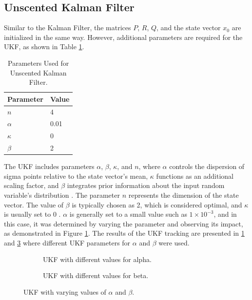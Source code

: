 \subsection{Unscented Kalman Filter}
Similar to the Kalman Filter, the matrices \(P\), \(R\), \(Q\), and the state vector \(x_0\) are initialized in the same way. However, additional parameters are required for the \ac{UKF}, as shown in Table \ref{tab:ukf_params}.
\begin{table}[H]
    \centering
    \large
    \caption{Parameters Used for Unscented Kalman Filter.}
    \label{tab:ukf_params}
    \begin{tabular}{ll}
        \toprule
        Parameter & Value \\
        \midrule
        \( n \) & 4 \\
        \( \alpha \) & 0.01 \\
        \( \kappa \) & 0 \\
        \( \beta \) & 2 \\
        \bottomrule
    \end{tabular}
\end{table}
The \ac{UKF} includes parameters \(\alpha\), \(\beta\), \(\kappa\), and \(n\), where \(\alpha\) controls the dispersion of sigma points relative to the state vector's mean, 
\(\kappa\) functions as an additional scaling factor, and \(\beta\) integrates prior information 
about the input random variable's distribution \cite{Cai2006}. The parameter \(n\) represents the dimension of the state vector. The value of \(\beta\) is typically chosen as 2, which is considered optimal, and \(\kappa\) is usually set to 0 \cite{Cai2006}. \(\alpha\) is generally set to a small value such as \(1 \times 10^{-3}\), and in this case, it was determined by varying the parameter and observing its impact, as demonstrated in Figure \ref{tab:ukf_params}.
 \newline
 \newline
The results of the \ac{UKF} tracking are presented in \ref{ukfres} and \ref{ukfres2} where different \ac{UKF} parameters for \(\alpha\) and \(\beta\) were used.
\begin{figure}[ht!]
    \centering
    \begin{subfigure}[b]{0.48\linewidth}
        \centering
        
        \caption{UKF with different values for alpha.}
        \label{ukfres}
    \end{subfigure}
    \hfill
    \begin{subfigure}[b]{0.48\linewidth}
        \centering
        
        \caption{UKF with different values for beta.}
        \label{ukfres2}
    \end{subfigure}
    \caption{UKF with varying values of \(\alpha\) and \(\beta\).}
\end{figure}
